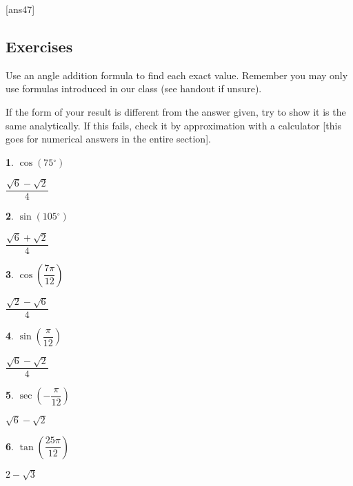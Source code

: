 \documentclass{amsbook}
\newtheorem{exc}{}
\newenvironment{ex}{\begin{exc}\normalfont}{\end{exc}}
\numberwithin{section}{chapter}
\numberwithin{equation}{chapter}
\newcommand{\dg}{{^\circ}}
\begin{document}
[ans47]
\subsection*{Exercises \nopunct} \hfill

Use an angle addition formula to find each exact value. Remember you may only use formulas introduced in our class (see handout if unsure).

 If the form of your result is different from the answer given, try to show it is the same analytically. If this fails, check it by approximation with a calculator [this goes for numerical answers in the entire section].

\begin{multicols}{2}
\begin{ex}
	$\cos\left(75\dg\right)$
	\begin{sol}
		$\dfrac{\sqrt{6}-\sqrt{2}}{4}$
	\end{sol}
\end{ex}

\begin{ex}
	$\sin\left(105\dg\right)$
	\begin{sol}
				$\dfrac{\sqrt{6}+\sqrt{2}}{4}$
	\end{sol}
\end{ex}

\begin{ex}
	$\cos\left(\dfrac{7\pi}{12}\right)$	
	\begin{sol}
		$\dfrac{\sqrt{2}-\sqrt{6}}{4}$
	\end{sol}
\end{ex}

\begin{ex}
	$\sin\left(\dfrac{\pi}{12}\right)$	
	\begin{sol}
		$\dfrac{\sqrt{6}-\sqrt{2}}{4}$		
	\end{sol}
\end{ex}

\begin{ex}
	$\sec\left(-\dfrac{\pi}{12}\right)$	
	\begin{sol}
		$\sqrt{6}-\sqrt{2}$
	\end{sol}
\end{ex}


\begin{ex}
	$\tan\left( \dfrac{25\pi}{12} \right)$	
	\begin{sol}
		$2-\sqrt{3}$
	\end{sol}
\end{ex}

\end{multicols}
\end{document}

